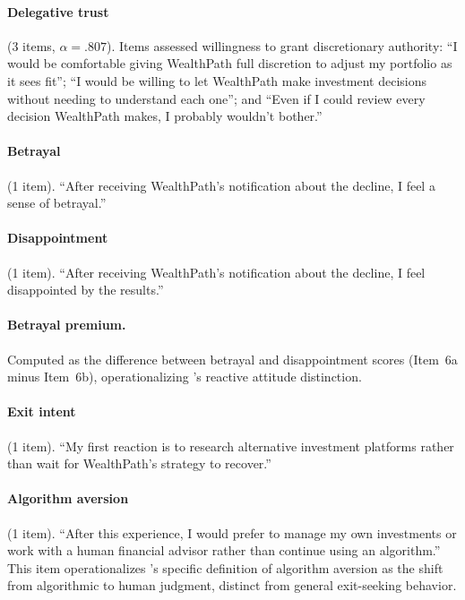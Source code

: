 \paragraph{Delegative trust} (3 items, $\alpha = .807$). Items assessed willingness to grant discretionary authority: ``I would be comfortable giving WealthPath full discretion to adjust my portfolio as it sees fit''; ``I would be willing to let WealthPath make investment decisions without needing to understand each one''; and ``Even if I could review every decision WealthPath makes, I probably wouldn't bother.''

\paragraph{Betrayal} (1 item). ``After receiving WealthPath's notification about the decline, I feel a sense of betrayal.''

\paragraph{Disappointment} (1 item). ``After receiving WealthPath's notification about the decline, I feel disappointed by the results.''

\paragraph{Betrayal premium.} Computed as the difference between betrayal and disappointment scores (Item~6a minus Item~6b), operationalizing \citeauthor{Holton1994}'s \citeyearpar{Holton1994} reactive attitude distinction.

\paragraph{Exit intent} (1 item). ``My first reaction is to research alternative investment platforms rather than wait for WealthPath's strategy to recover.''

\paragraph{Algorithm aversion} (1 item). ``After this experience, I would prefer to manage my own investments or work with a human financial advisor rather than continue using an algorithm.'' This item operationalizes \citeauthor{DietvorstSimmonsMassey2015}'s \citeyearpar{DietvorstSimmonsMassey2015} specific definition of algorithm aversion as the shift from algorithmic to human judgment, distinct from general exit-seeking behavior.

